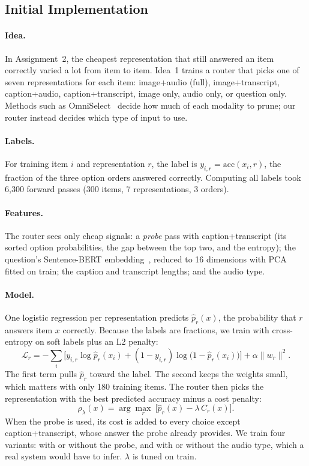 \documentclass{article}
\begin{document}
\subsection{Initial Implementation}

\paragraph{Idea.} In Assignment~2, the cheapest representation that still answered
an item correctly varied a lot from item to item. Idea~1 trains a router that picks
one of seven representations for each item: image+audio (full), image+transcript,
caption+audio, caption+transcript, image only, audio only, or question only.
Methods such as OmniSelect~\citep{yang2026omniselect} decide how much of each
modality to prune; our router instead decides which type of input to use.

\paragraph{Labels.} For training item $i$ and representation $r$, the label is
$y_{i,r}=\mathrm{acc}(x_i,r)$, the fraction of the three option orders answered
correctly. Computing all labels took 6,300 forward passes (300 items, 7
representations, 3 orders).

\paragraph{Features.} The router sees only cheap signals: a \emph{probe} pass with
caption+transcript (its sorted option probabilities, the gap between the top two,
and the entropy); the question's Sentence-BERT embedding~\citep{reimers2019sentencebert},
reduced to 16 dimensions with PCA fitted on train; the caption and transcript
lengths; and the audio type.

\paragraph{Model.} One logistic regression per representation predicts $\hat p_r(x)$,
the probability that $r$ answers item $x$ correctly. Because the labels are
fractions, we train with cross-entropy on soft labels plus an L2 penalty:
\begin{equation}
\mathcal{L}_r=-\sum_i\Big[y_{i,r}\log\hat p_r(x_i)+(1-y_{i,r})\log\big(1-\hat p_r(x_i)\big)\Big]+\alpha\|w_r\|^2 .
\end{equation}
The first term pulls $\hat p_r$ toward the label. The second keeps the weights small,
which matters with only 180 training items. The router then picks the
representation with the best predicted accuracy minus a cost penalty:
\begin{equation}
\rho_\lambda(x)=\arg\max_{r}\ \big[\hat p_r(x)-\lambda\,C_r(x)\big].
\end{equation}
When the probe is used, its cost is added to every choice except
caption+transcript, whose answer the probe already provides. We train four
variants: with or without the probe, and with or without the audio type, which a
real system would have to infer. $\lambda$ is tuned on train.
\end{document}
